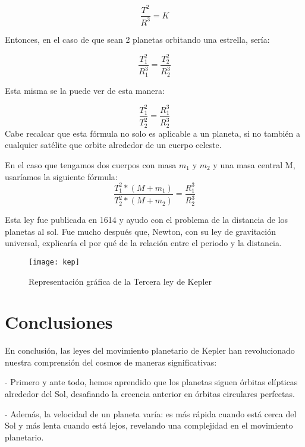 \documentclass[journal]{IEEEtran}
\begin{document}
\begin{equation}
   \frac{T^2}{R^3} = K
\end{equation}

Entonces, en el caso de que sean 2 planetas orbitando una estrella, sería:

\begin{equation}
   \frac{T_1^2}{R_1^3} = \frac{T_2^2}{R_2^3}
\end{equation}

Esta misma se la puede ver de esta manera:

\begin{equation}
   \frac{T_1^2}{T_2^2} = \frac{R_1^3}{R_2^3}
\end{equation}
Cabe recalcar que esta fórmula no solo es aplicable a un planeta, si no también a cualquier satélite que orbite alrededor de un cuerpo celeste.\cite{de2010leyes} \vspace{1mm}

En el  caso que tengamos dos cuerpos con masa $m_1$ y $m_2$ y una masa central M, usaríamos la siguiente fórmula:
\begin{equation}
   \frac{T_1^2 *(M+ m_1)}{T_2^2 * (M + m_2)} = \frac{R_1^3}{R_2^3}
\end{equation}



Esta ley fue publicada en 1614 y ayudo con el problema de la distancia de los planetas al sol. Fue mucho después que, Newton, con su ley de gravitación universal, explicaría el por qué de la relación entre el periodo y la distancia. \cite{KhanAcademy}

\begin{figure}[H]
    \centering
    \texttt{[image: kep]}
    \caption{Representación gráfica de la Tercera ley de Kepler}
    \label{fig:enter-label}
\end{figure}


\section{Conclusiones}
En conclusión, las leyes del movimiento planetario de Kepler han revolucionado nuestra comprensión del cosmos de maneras significativas:

- Primero y ante todo, hemos aprendido que los planetas siguen órbitas elípticas alrededor del Sol, desafiando la creencia anterior en órbitas circulares perfectas.

- Además, la velocidad de un planeta varía: es más rápida cuando está cerca del Sol y más lenta cuando está lejos, revelando una complejidad en el movimiento planetario.
\end{document}
